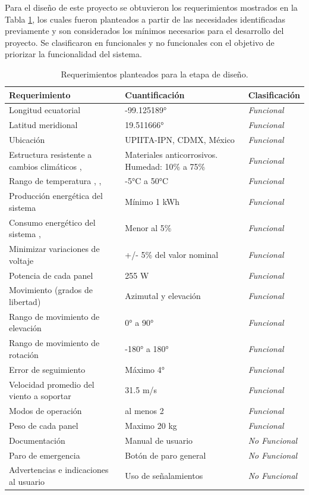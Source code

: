 \newpage
Para el diseño de este proyecto se obtuvieron los requerimientos mostrados en la Tabla \ref{tabla:request}, los cuales fueron planteados a partir de las necesidades identificadas previamente y son considerados los mínimos necesarios para el desarrollo del proyecto. Se clasificaron en funcionales y no funcionales con el objetivo de priorizar la funcionalidad del sistema.

\begin{table}[H]
	\centering
	\caption{Requerimientos planteados para la etapa de diseño.}
	\begin{tabular}{@{}|p{6cm}|p{4cm}|p{2.5cm}|} 
		\hline
		\textbf{Requerimiento} & \textbf{Cuantificación} & \textbf{Clasificación}  \\
		\hline \hline
		Longitud ecuatorial & -99.125189° & \textit{Funcional} \\ \hline
		Latitud meridional & 19.511666° & \textit{Funcional} \\ \hline
		Ubicación & UPIITA-IPN, CDMX, México & \textit{Funcional} \\ \hline
		Estructura resistente a cambios climáticos \cite{I6:2019:Online}, \cite{I5:2019:Online} & Materiales anticorrosivos.	Humedad: 10\% a 75\% & \textit{Funcional} \\ \hline
		Rango de temperatura \cite{I7}, \cite{I8}, \cite{I9} & -5°C a 50°C & \textit{Funcional} \\ \hline
		Producción energética del sistema & Mínimo 1 kWh & \textit{Funcional} \\ \hline
		Consumo energético del sistema \cite{DC2}, \cite{DC3} & Menor al 5\% & \textit{Funcional} \\ \hline
		Minimizar variaciones de voltaje \cite{DC3} & +/- 5\% del valor nominal & \textit{Funcional} \\ \hline
		Potencia de cada panel \cite{DC2} & 255 W & \textit{Funcional} \\ \hline
		Movimiento (grados de libertad) & Azimutal y elevación & \textit{Funcional} \\ \hline
		Rango de movimiento de elevación & 0° a 90° & \textit{Funcional} \\ \hline
		Rango de movimiento de rotación & -180° a 180° & \textit{Funcional} \\ \hline
		Error de seguimiento & Máximo 4° & \textit{Funcional} \\ \hline
		Velocidad promedio del viento a soportar \cite{I5:2019:Online} & 31.5 m/s & \textit{Funcional} \\ \hline
		Modos de operación & al menos 2 & \textit{Funcional} \\ \hline
		Peso de cada panel & Maximo 20 kg & \textit{Funcional} \\ \hline
		Documentación & Manual de usuario & \textit{No Funcional} \\ \hline
		Paro de emergencia & Botón de paro general & \textit{No Funcional} \\ \hline
		Advertencias e indicaciones al usuario & Uso de señalamientos & \textit{No Funcional} \\ \hline
	\end{tabular}		
	\label{tabla:request}
\end{table}

